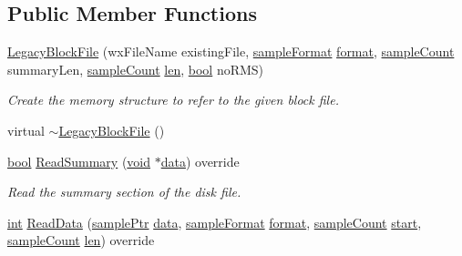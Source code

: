 \subsection*{Public Member Functions}
\begin{DoxyCompactItemize}
\item 
\hyperlink{class_legacy_block_file_a40adc6cb86499af6c1f4b76fc570e155}{Legacy\+Block\+File} (wx\+File\+Name existing\+File, \hyperlink{include_2audacity_2_types_8h_a9938d2e2f6adef23e745cd80ef379792}{sample\+Format} \hyperlink{_export_p_c_m_8cpp_a317afff57d87a89158c2b038d37b2b08}{format}, \hyperlink{include_2audacity_2_types_8h_afa427e1f521ea5ec12d054e8bd4d0f71}{sample\+Count} summary\+Len, \hyperlink{include_2audacity_2_types_8h_afa427e1f521ea5ec12d054e8bd4d0f71}{sample\+Count} \hyperlink{lib_2expat_8h_af86d325fecfc8f47b61fbf5a5146f582}{len}, \hyperlink{mac_2config_2i386_2lib-src_2libsoxr_2soxr-config_8h_abb452686968e48b67397da5f97445f5b}{bool} no\+R\+MS)
\begin{DoxyCompactList}\small\item\em Create the memory structure to refer to the given block file. \end{DoxyCompactList}\item 
virtual \hyperlink{class_legacy_block_file_a9c8c23a784c746b9d638e6fa8677e7d9}{$\sim$\+Legacy\+Block\+File} ()
\item 
\hyperlink{mac_2config_2i386_2lib-src_2libsoxr_2soxr-config_8h_abb452686968e48b67397da5f97445f5b}{bool} \hyperlink{class_legacy_block_file_a7648b5ac67a7d9d9634fb956b5e17980}{Read\+Summary} (\hyperlink{sound_8c_ae35f5844602719cf66324f4de2a658b3}{void} $\ast$\hyperlink{lib_2expat_8h_ac39e72a1de1cb50dbdc54b08d0432a24}{data}) override
\begin{DoxyCompactList}\small\item\em Read the summary section of the disk file. \end{DoxyCompactList}\item 
\hyperlink{xmltok_8h_a5a0d4a5641ce434f1d23533f2b2e6653}{int} \hyperlink{class_legacy_block_file_aa58ba2908ad820f6c01a9a838908569f}{Read\+Data} (\hyperlink{include_2audacity_2_types_8h_aaafb46d1caf7c79262fec96b577215fe}{sample\+Ptr} \hyperlink{lib_2expat_8h_ac39e72a1de1cb50dbdc54b08d0432a24}{data}, \hyperlink{include_2audacity_2_types_8h_a9938d2e2f6adef23e745cd80ef379792}{sample\+Format} \hyperlink{_export_p_c_m_8cpp_a317afff57d87a89158c2b038d37b2b08}{format}, \hyperlink{include_2audacity_2_types_8h_afa427e1f521ea5ec12d054e8bd4d0f71}{sample\+Count} \hyperlink{seqread_8c_ac503262ae470564980711da4f78b1181}{start}, \hyperlink{include_2audacity_2_types_8h_afa427e1f521ea5ec12d054e8bd4d0f71}{sample\+Count} \hyperlink{lib_2expat_8h_af86d325fecfc8f47b61fbf5a5146f582}{len}) override

\end{DoxyCompactItemize}
